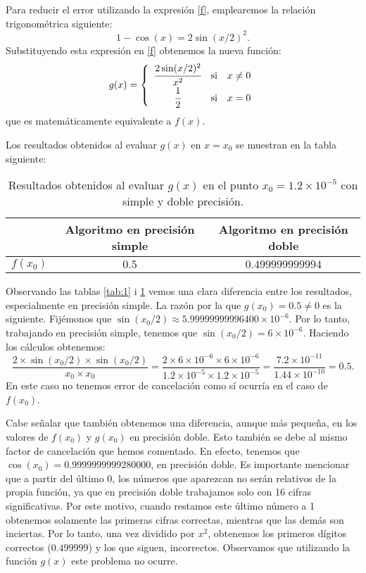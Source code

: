 \documentclass[a4paper]{article}
\begin{document}
Para reducir el error utilizando la expresión \eqref{f}, emplearemos la relación trigonométrica siguiente: $$1-\cos(x)=2\sin(x/2)^2.$$ Substituyendo esta expresión en \eqref{f} obtenemos la nueva función:
\begin{equation}
g(x)=\left\{\begin{array}{ccc}
    \cfrac{2\sin(x/2)^2}{x^2} & \text{si} & x\ne 0 \\
    \cfrac{1}{2} & \text{si} & x=0 
\end{array}\right.
\label{g}
\end{equation}
que es matemáticamente equivalente a $f(x)$.\par Los resultados obtenidos al evaluar $g(x)$ en $x=x_0$ se muestran en la tabla siguiente:\par
\begin{table}[ht]
    \centering
    \begin{tabular}{|c|c|c|}
        \hline
         & Algoritmo en precisión simple & Algoritmo en precisión doble \\
         \hline
         $f(x_0)$ & $0.5$ & $0.499999999994$\\
         \hline
    \end{tabular}
    \caption{Resultados obtenidos al evaluar $g(x)$ en el punto $x_0=1.2\times10^{-5}$ con simple y doble precisión.}
    \label{tab:2}
\end{table}
Observando las tablas \ref{tab:1} i \ref{tab:2} vemos una clara diferencia entre los resultados, especialmente en precisión simple. La razón por la que $g(x_0)=0.5\ne0$ es la siguiente. Fijémonos que $\sin(x_0/2)\approx5.99999999996400\times 10^{-6}$. Por lo tanto, trabajando en precisión simple, tenemos que $\sin(x_0/2)=6\times 10^{-6}$. Haciendo los cálculos obtenemos:
$$\frac{2\times\sin(x_0/2)\times\sin(x_0/2)}{x_0\times x_0}=\frac{2\times 6\times 10^{-6}\times 6\times 10^{-6}}{1.2\times 10^{-5}\times 1.2\times 10^{-5}}=\frac{7.2\times 10^{-11}}{1.44\times 10^{-10}}=0.5.$$
En este caso no tenemos error de cancelación como sí ocurría en el caso de $f(x_0)$.\par
Cabe señalar que también obtenemos una diferencia, aunque más pequeña, en los valores de $f(x_0)$ y $g(x_0)$ en precisión doble. Esto también se debe al mismo factor de cancelación que hemos comentado. En efecto, tenemos que $\cos(x_0)=0.9999999999280000$, en precisión doble. Es importante mencionar que a partir del último 0, los números que aparezcan no serán relativos de la propia función, ya que en precisión doble trabajamos solo con 16 cifras significativas. Por este motivo, cuando restamos este último número a 1 obtenemos solamente las primeras cifras correctas, mientras que las demás son inciertas. Por lo tanto, una vez dividido por $x^2$, obtenemos los primeros dígitos correctos ($0.499999$) y los que siguen, incorrectos. Observamos que utilizando la función $g(x)$ este problema no ocurre.
\newpage
\end{document}
